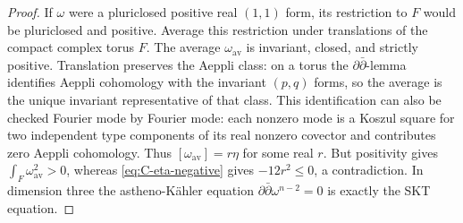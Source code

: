 \begin{proof}
If $\omega$ were a pluriclosed positive real $(1,1)$ form, its
restriction to $F$ would be pluriclosed and positive.  Average this
restriction under translations of the compact complex torus $F$.
The average $\omega_{\mathrm{av}}$ is invariant, closed, and
strictly positive.  Translation preserves the Aeppli class: on a
torus the $\partial\bar\partial$-lemma identifies Aeppli
cohomology with the invariant $(p,q)$ forms, so the average is the
unique invariant representative of that class.  This identification
can also be checked Fourier mode by Fourier mode: each nonzero mode
is a Koszul square for two independent type components of its real
nonzero covector and contributes zero Aeppli cohomology.  Thus
$[\omega_{\mathrm{av}}]=r\eta$ for some real $r$.
But positivity gives $\int_F\omega_{\mathrm{av}}^2>0$, whereas
\eqref{eq:C-eta-negative} gives $-12r^2\le0$, a contradiction.
In dimension three the astheno-K\"ahler equation
$\partial\bar\partial\omega^{n-2}=0$ is exactly the SKT equation.
\end{proof}

